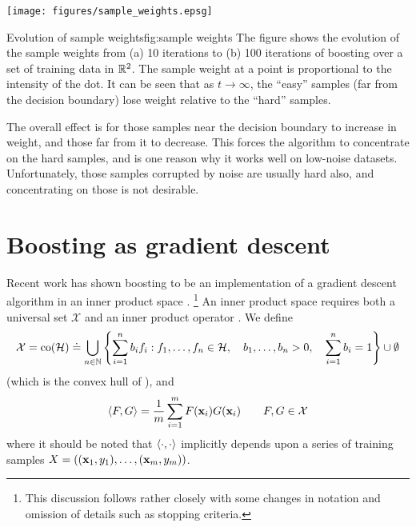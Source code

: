\begin{linefigure}
\begin{center}
\texttt{[image: figures/sample\_weights.epsg]}
\end{center}
\begin{capt}{Evolution of sample weights}{fig:sample weights}
The figure shows the evolution of the sample weights from (a) 10
iterations to (b) 100 iterations of boosting over a set of training
data in $\mathbb{R}^2$.  The sample weight at a point is proportional to the
intensity of the dot.  It can be seen that as $t \rightarrow \infty$,
the ``easy'' samples (far from the decision boundary) lose weight
relative to the ``hard'' samples.
\end{capt}
\end{linefigure}

The overall effect is for those samples near the decision boundary to
increase in weight, and those far from it to decrease.  This forces
the algorithm to concentrate on the hard samples, and is one reason
why it works well on low-noise datasets.  Unfortunately, those samples
corrupted by noise are usually hard also, and concentrating on those
is not desirable.


\section{Boosting as gradient descent}
\label{sec:theory:gradient descent}

Recent work has shown boosting to be an implementation of a gradient
descent algorithm in an inner product space
\cite{Mason99}.%
\footnote{This discussion follows \cite{Mason99} rather closely with
some changes in notation and omission of details such as stopping
criteria.}
An inner product space requires both a universal set $\mathcal{X}$ and
an inner product operator \ip{\cdot}{\cdot}.  We define
%
\begin{equation}
\mathcal{X} = 
\mathrm{co} (\mathcal{H}) \doteq
 \bigcup _{n \in \mathbb{N}}
\left\{
 \sum_{i=1}^{n}
  b_i
f_i : f_1, \ldots, f_n \in \mathcal{H}, \quad
 b_1, \ldots, b_n > 0, \quad
 \sum_{i=1}^{n} b_i = 1
\right\} \cup \emptyset
\end{equation}
%
(which is the convex hull of \calH), and
%
\begin{equation}
\langle {F} , {G} \rangle = \frac{1}{m} \sum_{i=1}^{m} F(\mathbf{x}_i)G(\mathbf{x}_i) \qquad
F, G \in \mathcal{X}
\label{eqn:inner product definition}
\end{equation}
%
where it should be noted that $\langle {\cdot} , {\cdot} \rangle$ implicitly depends
upon a series of training samples $X = ((\mathbf{x}_1, y_1), \ldots,
(\mathbf{x}_m, y_m))$.

